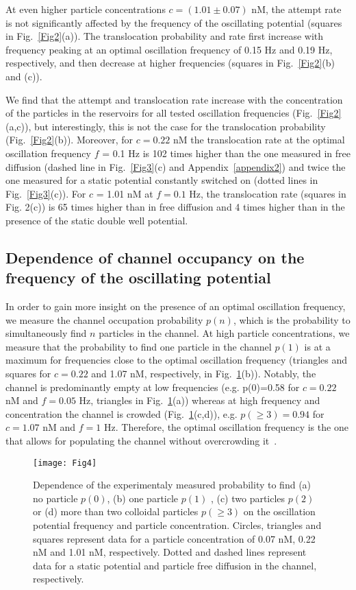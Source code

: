 \documentclass[
 reprint,
 aps, showkeys, showpacs
]{revtex4-1}
\begin{document}
At even higher particle concentrations $c = (1.01\pm 0.07)$ nM, the attempt rate is not significantly affected by the frequency of the oscillating potential (squares in Fig.~\ref{Fig2}(a)). The translocation  probability and rate first increase with frequency peaking at an optimal oscillation frequency of 0.15 Hz and 0.19 Hz, respectively, and then decrease at higher frequencies (squares in Fig.~\ref{Fig2}(b) and (c)). 

We find that the attempt and translocation rate increase with the concentration of the particles in the reservoirs for all tested oscillation frequencies (Fig.~\ref{Fig2}(a,c)), but interestingly,  this is not the case for the translocation probability (Fig.~\ref{Fig2}(b)). Moreover, for $c = 0.22$ nM the translocation rate at the optimal oscillation frequency $f$ = 0.1 Hz is 102 times higher than the one measured in free diffusion (dashed line in Fig.~\ref{Fig3}(c) and Appendix~\ref{appendix2}) and twice the one measured for a static potential constantly switched on (dotted lines in Fig.~\ref{Fig3}(c)). For $c$ = 1.01 nM at $f=0.1$ Hz, the translocation rate (squares in Fig. 2(c)) is 65 times higher than in free diffusion and 4 times higher than in the presence of the static double well potential.

\subsection{Dependence of channel occupancy on the frequency of the oscillating potential}
In order to gain more insight on the presence of an optimal oscillation frequency, we measure the channel occupation probability $p(n)$, which is the probability to simultaneously find $n$ particles in the channel. At high particle concentrations, we measure that the probability to find one particle in the channel $p(1)$ is at a maximum for frequencies close to the optimal oscillation frequency (triangles and squares for $c=0.22$ and 1.07 nM, respectively, in Fig.~\ref{Fig4}(b)). Notably, the channel is predominantly empty at low frequencies (e.g. p(0)=0.58 for $c=0.22$ nM and $f=0.05$ Hz, triangles in Fig.~\ref{Fig4}(a)) whereas at high frequency and concentration the channel is crowded (Fig.~\ref{Fig4}(c,d)), e.g. $p(\geq3)=0.94$ for $c=1.07$ nM and $f=1$ Hz. Therefore, the optimal oscillation frequency is the one that allows for populating the channel without overcrowding it~\cite{Pagliara2014e}. 

\begin{figure}
\texttt{[image: Fig4]}
\caption{\label{Fig4} Dependence of the experimentaly measured probability to find (a) no particle $p(0)$, (b) one particle $p(1)$ , (c) two particles $p(2)$ or (d) more than two colloidal particles $p(\geq3)$ on the oscillation potential frequency and particle concentration. Circles, triangles and squares represent data for a particle concentration of 0.07 nM, 0.22 nM and 1.01 nM, respectively. Dotted and dashed lines represent data for a static potential and  particle free diffusion in the channel, respectively.}
\end{figure}
\end{document}
